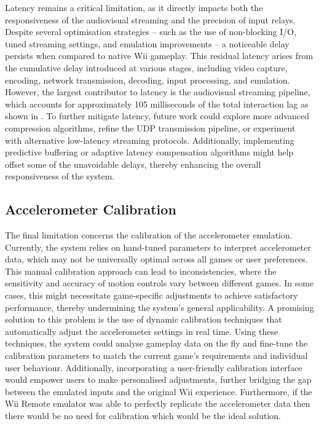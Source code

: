 Latency remains a critical limitation, as it directly impacts both the
responsiveness of the audiovisual streaming and the precision of input relays.
Despite several optimisation strategies -- such as the use of non-blocking I/O,
tuned streaming settings, and emulation improvements -- a noticeable delay
persists when compared to native Wii gameplay. This residual latency arises from
the cumulative delay introduced at various stages, including video capture,
encoding, network transmission, decoding, input processing, and emulation.
However, the largest contributor to latency is the audiovisual streaming
pipeline, which accounts for approximately 105 milliseconds of the total
interaction lag as shown in . To further
mitigate latency, future work could explore more advanced compression
algorithms, refine the UDP transmission pipeline, or experiment with alternative
low-latency streaming protocols. Additionally, implementing predictive buffering
or adaptive latency compensation algorithms might help offset some of the
unavoidable delays, thereby enhancing the overall responsiveness of the system.

\subsection{Accelerometer Calibration}

The final limitation concerns the calibration of the accelerometer emulation.
Currently, the system relies on hand-tuned parameters to interpret accelerometer
data, which may not be universally optimal across all games or user preferences.
This manual calibration approach can lead to inconsistencies, where the
sensitivity and accuracy of motion controls vary between different games. In
some cases, this might necessitate game-specific adjustments to achieve
satisfactory performance, thereby undermining the system’s general
applicability. A promising solution to this problem is the use of dynamic
calibration techniques that automatically adjust the accelerometer settings in
real time. Using these techniques, the system could analyse gameplay data on the
fly and fine-tune the calibration parameters to match the current game’s
requirements and individual user behaviour. Additionally, incorporating a
user-friendly calibration interface would empower users to make personalised
adjustments, further bridging the gap between the emulated inputs and the
original Wii experience. Furthermore, if the Wii Remote emulator was able to
perfectly replicate the accelerometer data then there would be no need for
calibration which would be the ideal solution.

